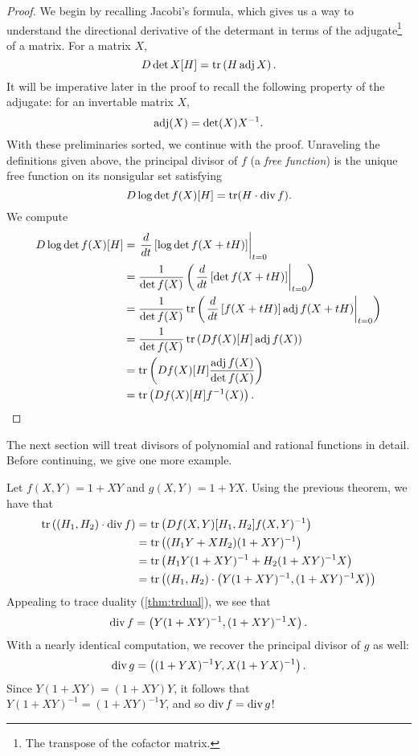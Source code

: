 \begin{proof}
  We begin by recalling Jacobi's formula, which gives us a way to understand the
  directional derivative of the determant in terms of the adjugate\footnote{The
    transpose of the cofactor matrix.}
  of a matrix. For a matrix \(X\),
  \[
    D \det X [H] = \operatorname{tr} \left( H \operatorname{adj} X \right).
  \]
  It will be imperative later in the proof to recall the following property of
  the adjugate: for an invertable matrix \(X\),
  \[
    \operatorname{adj} (X) = \det(X) X ^{-1}.
  \]
  With these preliminaries sorted, we continue with the proof.
  Unraveling the definitions given above, the principal divisor of \(f\) (a
  \emph{free function}) is the unique free function on its nonsigular set satisfying
  \[
    D \log \det f (X)[H] = \operatorname{tr} (H \cdot \operatorname{div} f).
  \]
  We compute
  \begin{align*}
    D \log \det f(X)[H] &=\left. \frac{d}{dt} \left[\log \det f(X+tH) \right]\right|_{t=0} \\
                        &= \frac{1}{\det f(X)} \left(\left. \frac{d}{dt} \left[ \det f(X+tH)\right]\right|_{t=0}\right)\\
                        &= \frac{1}{\det f(X)} \operatorname{tr}\left(\left. \frac{d}{dt} \left[ f(X+tH)\right] \operatorname{adj} f(X+tH)\right|_{t=0}\right)\\
                        &= \frac{1}{\det f(X)} \operatorname{tr}\left(Df(X)[H] \operatorname{adj} f(X)\right)\\
                        &= \operatorname{tr} \left( Df(X)[H] \frac{\operatorname{adj} f(X)}{\det f(X)}\right) \\
                        &= \operatorname{tr} \left( Df(X)[H] f ^{-1}(X) \right).
  \end{align*}
\end{proof}

The next section will treat divisors of polynomial and rational functions in
detail. Before continuing, we give one more example.

\begin{example}
  Let \(f(X,Y) = 1+XY\) and \(g(X,Y) =1+YX\). Using the previous theorem, we
  have that
  \begin{align*}
    \operatorname{tr} \left( (H_1,H_2) \cdot \operatorname{div} f \right)
      &= \operatorname{tr} \left(Df(X,Y)[H_1,H_2] f(X,Y) ^{-1}\right)\\
      &= \operatorname{tr} \left( (H_1Y + X H_2) (1+XY) ^{-1}\right) \\
      &= \operatorname{tr} \left( H_1Y(1+XY)^{-1} + H_2(1+XY)^{-1}X \right)\\
    &= \operatorname{tr} \left( (H_1,H_2) \cdot \left(Y(1+XY)^{-1},(1+XY)^{-1}X\right) \right)
  \end{align*}
  Appealing to trace duality (\cref{thm:trdual}), we see that
  \[
    \operatorname{div} f = \left( Y(1+XY)^{-1},(1+XY)^{-1}X \right).
  \]
  With a nearly identical computation, we recover the principal divisor of \(g\)
  as well:
  \[
    \operatorname{div} g  = \left( (1+YX)^{-1}Y,X(1+YX)^{-1} \right).
  \]
  Since \(Y(1+XY)=(1+XY)Y\), it follows that
  \(Y(1+XY)^{-1}= (1+XY) ^{-1}Y\), and so \(\operatorname{div} f = \operatorname{div} g\)!
\end{example}

